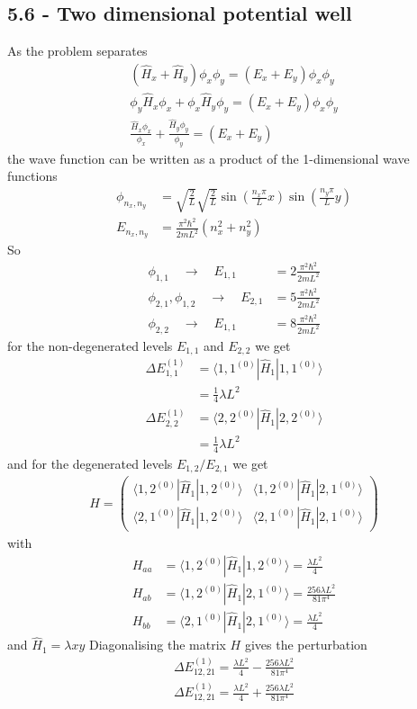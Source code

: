 \documentclass[../main.tex]{subfiles}
\begin{document}
\subsection{5.6 - Two dimensional potential well}
As the problem separates 
\begin{align}
\left(\hat{H}_x+\hat{H}_y\right)\phi_x\phi_y=(E_x+E_y)\phi_x\phi_y\\
\phi_y\hat{H}_x\phi_x+\phi_x\hat{H}_y\phi_y=(E_x+E_y)\phi_x\phi_y\\
\frac{\hat{H}_x\phi_x}{\phi_x}+\frac{\hat{H}_y\phi_y}{\phi_y}=(E_x+E_y)
\end{align}
the wave function can be written as a product of the 1-dimensional wave functions
\begin{align}
\phi_{n_x,n_y}&=\sqrt{\frac{2}{L}}\sqrt{\frac{2}{L}}\sin\left(\frac{n_x\pi}{L}x\right)\sin\left(\frac{n_y\pi}{L}y\right)\\
E_{n_x,n_y}&=\frac{\pi^2\hbar^2}{2mL^2}(n_x^2+n_y^2)
\end{align}
So 
\begin{align}
\phi_{1,1}\quad\rightarrow\quad E_{1,1}&=2\frac{\pi^2\hbar^2}{2mL^2}\\
\phi_{2,1},\phi_{1,2}\quad\rightarrow\quad E_{2,1}&=5\frac{\pi^2\hbar^2}{2mL^2}\\
\phi_{2,2}\quad\rightarrow\quad E_{1,1}&=8\frac{\pi^2\hbar^2}{2mL^2}
\end{align}
for the non-degenerated levels $E_{1,1}$ and $E_{2,2}$ we get
\begin{align}
\Delta E_{1,1}^{(1)}&=\langle 1,1^{(0)}|\hat{H}_1|1,1^{(0)}\rangle\\
&=\frac{1}{4}\lambda L^2\\
\Delta E_{2,2}^{(1)}&=\langle 2,2^{(0)}|\hat{H}_1|2,2^{(0)}\rangle\\
&=\frac{1}{4}\lambda L^2
\end{align}
and for the degenerated levels $E_{1,2}/E_{2,1}$ we get
\begin{align}
H=
\begin{pmatrix}
\langle 1,2^{(0)}|\hat{H}_1|1,2^{(0)}\rangle & \langle 1,2^{(0)}|\hat{H}_1|2,1^{(0)}\rangle\\
\langle 2,1^{(0)}|\hat{H}_1|1,2^{(0)}\rangle & \langle 2,1^{(0)}|\hat{H}_1|2,1^{(0)}\rangle
\end{pmatrix}
\end{align}
with
\begin{align}
H_{aa}&=\langle 1,2^{(0)}|\hat{H}_1|1,2^{(0)}\rangle=\frac{\lambda L^2}{4}\\
H_{ab}&=\langle 1,2^{(0)}|\hat{H}_1|2,1^{(0)}\rangle=\frac{256\lambda L^2}{81\pi^4}\\
H_{bb}&=\langle 2,1^{(0)}|\hat{H}_1|2,1^{(0)}\rangle=\frac{\lambda L^2}{4}
\end{align}
and $\hat{H}_1=\lambda x y$ Diagonalising the matrix $H$ gives the perturbation
\begin{align}
\Delta E_{12,21}^{(1)}=\frac{\lambda L^2}{4}-\frac{256\lambda L^2}{81\pi^4}\\
\Delta E_{12,21}^{(1)}=\frac{\lambda L^2}{4}+\frac{256\lambda L^2}{81\pi^4}\\
\end{align}
\end{document}

